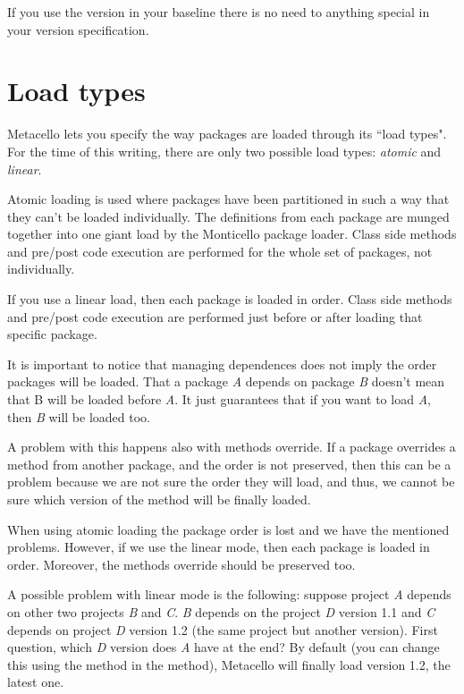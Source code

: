 \documentclass[a4paper,10pt,twoside]{book}
\begin{document}
If you use the  version in your baseline there is no need to anything special in your version specification.




\section{Load types}
Metacello lets you specify the way packages are loaded through its ``load types". For the time of this writing, there are only two possible load types: \emph{atomic} and \emph{linear}. 

Atomic loading is used where packages have been partitioned in such a way that they can't be loaded individually. The definitions from each package are munged together into one giant load by the Monticello package loader. Class side  methods and pre/post code execution are performed for the whole set of packages, not individually. 

If you use a linear load, then each package is loaded in order. Class side  methods and pre/post code execution are performed just before or after loading that specific package.

It is important to notice that managing dependences does not imply the order packages will be loaded. That a package \emph{A} depends on package \emph{B} doesn't mean that B will be loaded before \emph{A}. It just guarantees that if you want to load \emph{A}, then \emph{B} will be loaded too. 

A problem with this happens also with methods override. If a package overrides a method from another package, and the order is not preserved, then this can be a problem because we are not sure the order they will load, and thus, we cannot be sure which version of the method will be finally loaded. 

When using atomic loading the package order is lost and we have the mentioned problems. However, if we use the linear mode, then each package is loaded in order. Moreover, the methods override should be preserved too. 

A possible problem with linear mode is the following: suppose project \emph{A} depends on other two projects \emph{B} and \emph{C}. \emph{B} depends on the project \emph{D} version 1.1 and \emph{C} depends on project \emph{D} version 1.2 (the same project but another version). First question, which \emph{D} version does \emph{A} have at the end?  By default (you can change this using the method  in the  method), Metacello will finally load version 1.2, \ie the latest one.
\end{document}
